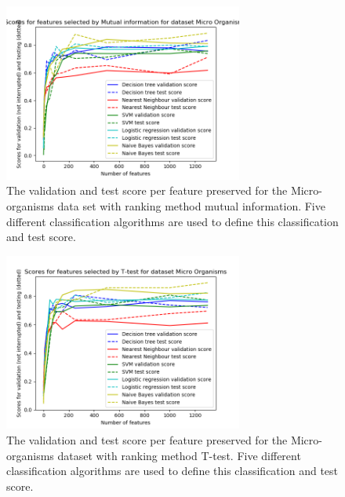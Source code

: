 \documentclass[10pt,a4paper]{report}
\begin{document}
	\begin{figure}[H]
		\includegraphics[width=0.7\textwidth]{MO_MI_Val_Test_Score.png}
		\caption{The validation and test score per feature preserved for the Micro-organisms data set with ranking method mutual information. Five different classification algorithms are used to define this classification and test score.}
		\label{fig:MO_MI_Val_Test_Score}
	\end{figure}
	
	\begin{figure}[H]
		\includegraphics[width=0.7\textwidth]{MO_T_Val_Test_Score.png}
		\caption{The validation and test score per feature preserved for the Micro-organisms dataset with ranking method T-test. Five different classification algorithms are used to define this classification and test score.}
		\label{fig:MO_T_Val_Test_Score}
	\end{figure}
	
\end{document}
